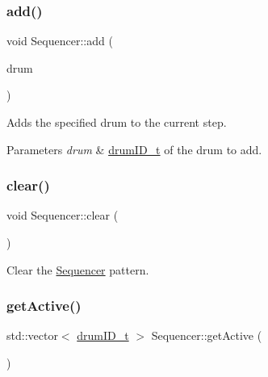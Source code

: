 \subsubsection{\texorpdfstring{add()}{add()}\hspace{0.1cm}{\footnotesize\ttfamily [2/2]}}
{\footnotesize\ttfamily void Sequencer\+::add (\begin{DoxyParamCaption}\item[{\hyperlink{namespacedrumpi_a3897274035c1b939a604438abe648b1b}{drum\+I\+D\+\_\+t}}]{drum }\end{DoxyParamCaption})}

Adds the specified drum to the current step. 
\begin{DoxyParams}{Parameters}
{\em drum} & \hyperlink{namespacedrumpi_a3897274035c1b939a604438abe648b1b}{drum\+I\+D\+\_\+t} of the drum to add. \\
\hline
\end{DoxyParams}
\mbox{\label{classdrumpi_1_1Sequencer_a8b7b4faa1438aedb59370bb5ef44f571}} 
\subsubsection{\texorpdfstring{clear()}{clear()}}
{\footnotesize\ttfamily void Sequencer\+::clear (\begin{DoxyParamCaption}{ }\end{DoxyParamCaption})}

Clear the \hyperlink{classdrumpi_1_1Sequencer}{Sequencer} pattern. \mbox{\label{classdrumpi_1_1Sequencer_a3a4981971243ac03ace9b57fc0a6c8c6}} 
\subsubsection{\texorpdfstring{get\+Active()}{getActive()}}
{\footnotesize\ttfamily std\+::vector$<$ \hyperlink{namespacedrumpi_a3897274035c1b939a604438abe648b1b}{drum\+I\+D\+\_\+t} $>$ Sequencer\+::get\+Active (\begin{DoxyParamCaption}{ }\end{DoxyParamCaption})}

